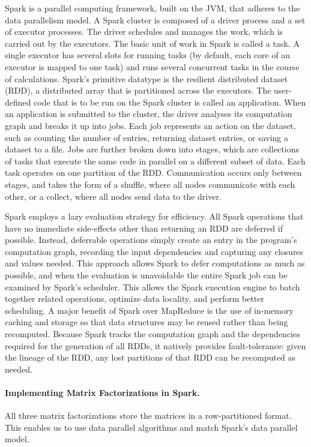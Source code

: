Spark is a parallel computing framework, built on the JVM, that adheres to the data parallelism model. A Spark cluster is composed of a driver process and a set of executor processes. The driver schedules and manages the work, which is carried out by the executors. The basic unit of work in Spark is called a task. A single executor has several slots for running tasks (by default, each core of an executor is mapped to one task) and runs several concurrent tasks in the course of calculations. Spark's primitive datatype is the resilient distributed dataset (RDD), a distributed array that is partitioned across the executors. The user-defined code that is to be run on the Spark cluster is called an application. When an application is submitted to the cluster, the driver analyses its computation graph and breaks it up into jobs.  Each job represents an action on the dataset, such as counting the number of entries, returning dataset entries, or saving a dataset to a file. Jobs are further broken down into stages, which are collections of tasks that execute the same code in parallel on a different subset of data. Each task operates on one partition of the RDD. Communication occurs only between stages, and takes the form of a shuffle, where all nodes communicate with each other, or a collect, where all nodes send data to the driver.

Spark employs a lazy evaluation strategy for efficiency. All Spark operations that have no immediate side-effects other than returning an RDD are deferred if possible. Instead, deferrable operations simply create an entry in the program's computation graph, recording the input dependencies and capturing any closures and values needed. This approach allows Spark to defer computations as much as possible, and when the evaluation is unavoidable the entire Spark job can be examined by Spark's scheduler. This allows the Spark execution engine to batch together related operations, optimize data locality, and perform better scheduling. A major benefit of Spark over MapReduce is the use of in-memory caching and storage so that data structures may be reused rather than being recomputed. Because Spark tracks the computation graph and the dependencies required for the generation of all RDDs, it natively provides fault-tolerance: given the lineage of the RDD, any lost partitions of that RDD can be recomputed as needed.

\paragraph{Implementing Matrix Factorizations in Spark.}
All three matrix factorizations store the matrices in a row-partitioned format. This enables us to use data parallel algorithms and match Spark's data parallel model.

